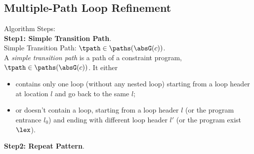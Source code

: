 \subsection{Multiple-Path Loop Refinement}
\label{sec:refine}
Algorithm Steps:
\\
\textbf{Step1: Simple Transition Path}.
\\
% 
Simple Transition Path: $\tpath \in \paths(\absG(c))$.
\\
A \emph{simple transition path} is a path of a constraint program, $\tpath \in \paths(\absG(c))$.
It either
\begin{itemize}
  \item contains only one loop (without any nested loop) starting from a loop header at location $l$ and go back to the same $l$;
  \item or doesn't contain a loop, starting from a loop header $l$ (or the program entrance $l_0$)
and ending with different loop header $l'$ (or the program exist $\lex$).
\end{itemize}
%
\textbf{Step2: Repeat Pattern}.
